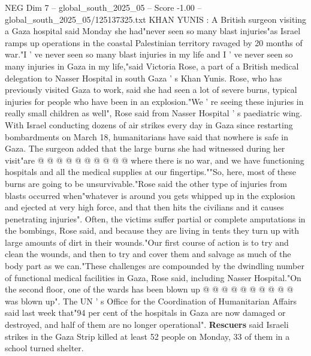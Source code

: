 \begin{textsample}{NEG Dim 7 – global\_south\_2025\_05 – Score -1.00 – global\_south\_2025\_05/125137325.txt}  \label{ex:f7_neg_019}
KHAN YUNIS : A British surgeon visiting a Gaza hospital said Monday she had"never seen so many blast injuries"as Israel ramps up operations in the coastal Palestinian territory ravaged by 20 months of war."I ' ve never seen so many blast injuries in my life and I ' ve never seen so many injuries in Gaza in my life,"said Victoria Rose, a part of a British medical delegation to Nasser Hospital in south Gaza ' s Khan Yunis.
Rose, who has previously visited Gaza to work, said she had seen a lot of severe burns, typical injuries for people who have been in an explosion."We ' re seeing these injuries in really small children as well", Rose said from Nasser Hospital ' s paediatric wing.
With Israel conducting dozens of air strikes every day in Gaza since restarting bombardments on March 18, humanitarians have said that nowhere is safe in Gaza.
The surgeon added that the large burns she had witnessed during her visit"are @ @ @ @ @ @ @ @ @ @ where there is no war, and we have functioning hospitals and all the medical supplies at our fingertips.""So, here, most of these burns are going to be unsurvivable."Rose said the other type of injuries from blasts occurred when"whatever is around you gets whipped up in the explosion and ejected at very high force, and that then hits the civilians and it causes penetrating injuries".
Often, the victims suffer partial or complete amputations in the bombings, Rose said, and because they are living in tents they turn up with large amounts of dirt in their wounds."Our first course of action is to try and clean the wounds, and then to try and cover them and salvage as much of the body part as we can."These challenges are compounded by the dwindling number of functional medical facilities in Gaza, Rose said, including Nasser Hospital."On the second floor, one of the wards has been blown up @ @ @ @ @ @ @ @ @ @ was blown up".
The UN ' s Office for the Coordination of Humanitarian Affairs said last week that"94 per cent of the hospitals in Gaza are now damaged or destroyed, and half of them are no longer operational". \textbf{Rescuers} said Israeli strikes in the Gaza Strip killed at least 52 people on Monday, 33 of them in a school turned shelter.

\end{textsample}

